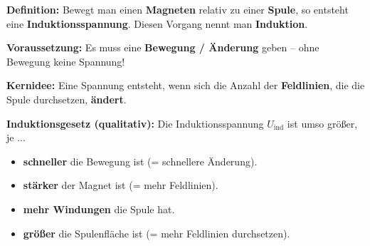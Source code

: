 \documentclass[11pt,a4paper]{article}
\newcommand{\lsg}[1]{\textcolor{loesung}{\textbf{#1}}}
\begin{document}
\begin{merkebox}[title=Kasten 3: Merksatz -- Elektromagnetische Induktion]
\small
\textbf{Definition:} Bewegt man einen \lsg{Magneten} relativ zu einer \lsg{Spule}, so entsteht eine \lsg{Induktionsspannung}. Diesen Vorgang nennt man \textbf{Induktion}.

\vspace{0.3em}
\textbf{Voraussetzung:} Es muss eine \lsg{Bewegung / Änderung} geben -- ohne Bewegung keine Spannung!

\vspace{0.3em}
\textbf{Kernidee:} Eine Spannung entsteht, wenn sich die Anzahl der \lsg{Feldlinien}, die die Spule durchsetzen, \textbf{ändert}.

\vspace{0.3em}
\textbf{Induktionsgesetz (qualitativ):} Die Induktionsspannung $U_{\text{ind}}$ ist umso größer, je ...
\begin{itemize}[leftmargin=1.2cm, itemsep=0pt, topsep=2pt]
    \item[$\triangleright$] \lsg{schneller} die Bewegung ist (= schnellere Änderung).
    \item[$\triangleright$] \lsg{stärker} der Magnet ist (= mehr Feldlinien).
    \item[$\triangleright$] \lsg{mehr Windungen} die Spule hat.
    \item[$\triangleright$] \lsg{größer} die Spulenfläche ist (= mehr Feldlinien durchsetzen).
\end{itemize}
\end{merkebox}

\newpage
\end{document}
